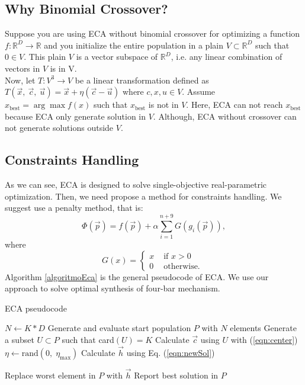 \documentclass[12pt,letterpape]{article}
\begin{document}
\subsection{Why Binomial Crossover?} %
\label{sub:why_binomial_crossover_}

Suppose you are using ECA without binomial crossover for optimizing a function $f:\mathbb{R}^D \to \mathbb{R}$ and you initialize the entire population in a plain $V \subset \mathbb{R}^D $ such that $0 \in V$. This plain $V$ is a vector subspace of $\mathbb{R}^D$, i.e. any linear combination of vectors in $V$ is in V.\\

Now, let $T:V^3 \to V$ be a linear transformation defined as $ T(\vec{x},\ \vec{c},\ \vec{u}) = \vec{x} + \eta ( \vec{c} - \vec{u} )$ where $c,x,u \in V$. Assume $x_\text{best} = \arg \max f(x)$ such that $x_\text{best} $ is not in $V$. Here, ECA can not reach $x_\text{best}$ because ECA only generate solution in $V$. Although, ECA without crossover can not generate solutions outside $V$.


\subsection{Constraints Handling} %
\label{sub:constraints_handling}

As we can see, ECA is designed to solve single-objective real-parametric optimization. Then, we need propose a method for constraints handling. We suggest use a penalty
method, that is:
% 
\begin{equation}
	\Phi( \vec{p} ) = f( \vec{p} ) + \alpha \sum_{i=1}^{n+9} G(g_i( \vec{p} ) ),
% 
	\label{eqn:phiObj}
% 
\end{equation}
where 
$$
G(x) = 
\begin{cases}
	\displaystyle
	x & \text{ if } x > 0 \\
	0 & \text{ otherwise. }
\end{cases}
$$
% 
Algorithm \ref{algoritmoEca} is the general pseudocode of ECA. We use our approach
to solve optimal synthesis of four-bar mechanism.

\begin{algorithm}[!ht]
	\caption{ECA pseudocode}
	\label{algoritmoEca}
	\begin{algorithmic}[1]
		\State $N \gets K * D$
		\State Generate and evaluate start population $P$ with $N$ elements
				\State Generate a subset $U \subset P$ such that  card$(U) = K$
				\State Calculate $\vec{c}$ using $U$ with (\ref{eqn:center})
				\State $\eta \gets \text{rand}(0,\; \eta_{\max}) $ 
				\State Calculate $\vec{h}$ using Eq. (\ref{eqn:newSol})
				
					\State Replace worst element in $P$ with $\vec{h}$
				\EndIf
			\EndFor
		\EndWhile
		\State Report best solution in $P$
		\EndProcedure
	\end{algorithmic}
\end{algorithm}
\end{document}
